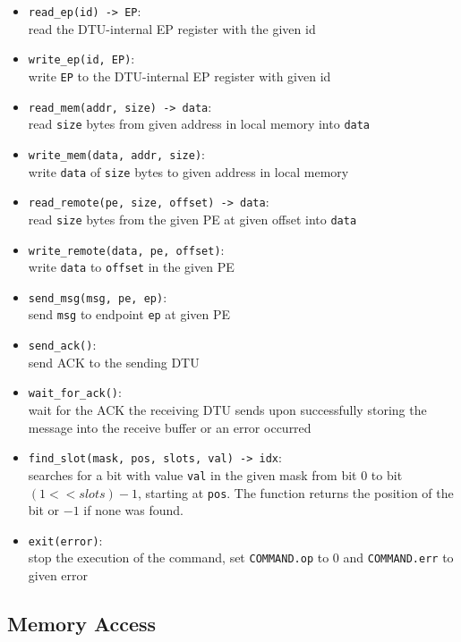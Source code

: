 \documentclass[a4paper,11pt,draft]{article}
\begin{document}
\begin{itemize}
  \item \texttt{read\_ep(id) -> EP}:\\
  read the DTU-internal EP register with the given id
  \item \texttt{write\_ep(id, EP)}:\\
  write \texttt{EP} to the DTU-internal EP register with given id
  \item \texttt{read\_mem(addr, size) -> data}:\\
  read \texttt{size} bytes from given address in local memory into \texttt{data}
  \item \texttt{write\_mem(data, addr, size)}:\\
  write \texttt{data} of \texttt{size} bytes to given address in local memory
  \item \texttt{read\_remote(pe, size, offset) -> data}:\\
  read \texttt{size} bytes from the given PE at given offset into \texttt{data}
  \item \texttt{write\_remote(data, pe, offset)}:\\
  write \texttt{data} to \texttt{offset} in the given PE
  \item \texttt{send\_msg(msg, pe, ep)}:\\
  send \texttt{msg} to endpoint \texttt{ep} at given PE
  \item \texttt{send\_ack()}:\\
  send ACK to the sending DTU
  \item \texttt{wait\_for\_ack()}:\\
  wait for the ACK the receiving DTU sends upon successfully storing the message into the receive
  buffer or an error occurred
  \item \texttt{find\_slot(mask, pos, slots, val) -> idx}:\\
  searches for a bit with value \texttt{val} in the given mask from bit 0 to bit $(1 << slots) - 1$,
  starting at \texttt{pos}. The function returns the position of the bit or $-1$ if none was found.
  \item \texttt{exit(error)}:\\
  stop the execution of the command, set \texttt{COMMAND.op} to 0 and \texttt{COMMAND.err} to given error
\end{itemize}

\subsection{Memory Access}
\end{document}
